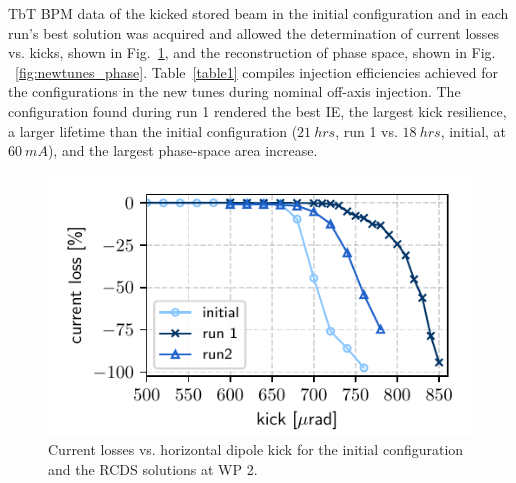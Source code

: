 \documentclass[a4paper,
               keeplastbox,   %
               ]{jacow}
\begin{document}
TbT BPM data of the kicked stored beam  in the initial configuration and in each run's best solution was acquired and allowed the determination of current losses vs. kicks, shown in Fig.~\ref{fig:loss_kicks_newtunes}, and the reconstruction of phase space, shown in Fig. ~\ref{fig:newtunes_phase}. Table~\ref{table1} compiles injection efficiencies achieved for the configurations in the new tunes during nominal off-axis injection. The configuration found during run 1 rendered the best IE, the largest kick resilience, a larger lifetime than the initial configuration ($21~\unit{hrs}$, run 1 vs. $18~\unit{hrs}$, initial, at $60~\unit{mA}$), and the largest phase-space area increase.
\begin{figure}[!h]
   \includegraphics[width=\columnwidth]{WEPL087_f3.pdf}
   \caption{Current losses vs. horizontal dipole kick for the initial configuration and the RCDS solutions at WP 2.}
   \label{fig:loss_kicks_newtunes}
\end{figure}
\end{document}
